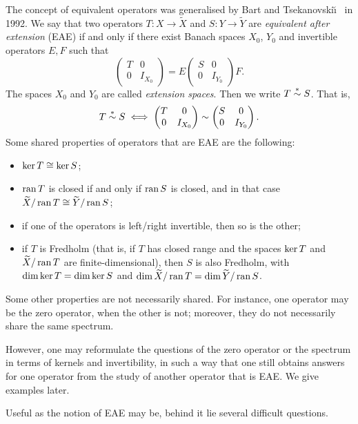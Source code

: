 \documentclass[11pt]{article}
\def\beq{\begin{equation}}
\def\eeq{\end{equation}}
\def\wX{\widetilde X}
\def\wY{\widetilde Y}
\def\ker{\mathop{\rm ker}\nolimits}
\def\ran{\mathop{\rm ran}\nolimits}
\newcommand{\simast}{%
    \ensuremath{%
       \stackrel{\mathsf{\ast}}{\sim}}}
\begin{document}
The concept of equivalent operators was generalised by Bart and Tseka\-novski\u\i~\cite{BTsk} in 1992. We say that two operators $T: X \to \wX$ and $S:Y \to \wY$ are
{\em equivalent after extension\/} (EAE) if and only if there exist Banach spaces $X_0$, $Y_0$
and invertible operators $E,F$ such that
\beq\label{eq:8}
\begin{pmatrix}
T & 0 \\ 0 & I_{X_0}
\end{pmatrix} = 
E
\begin{pmatrix}
S & 0 \\ 0 & I_{Y_0}
\end{pmatrix}
F.
\eeq
The spaces $X_0$ and $Y_0$ are called {\em extension spaces}. Then we write $T \simast S$.
That is,
\[ T \simast S \iff \begin{pmatrix}
T & 0 \\ 0 & I_{X_0}
\end{pmatrix} \sim
\begin{pmatrix}
S & 0 \\ 0 & I_{Y_0}
\end{pmatrix}.
\]
Some shared properties of operators that are EAE are the following:
\begin{itemize}
\item $\ker T \cong \ker S$;
\item $\ran T$ is closed if and only if $\ran S$ is closed, and in that case\\
$\wX/\ran T \cong \wY/\ran S$;
\item if one of the operators is left/right invertible, then so is the other;
\item if $T$ is Fredholm  (that is, if $T$  has closed range and
the spaces   
$\ker T$ and $\wX/\ran T$ are finite-dimensional), then  $S$ is also Fredholm, with $\dim \ker T=\dim \ker S$
and $\dim \wX/\ran T = \dim  \wY/\ran S$.
\end{itemize}
Some other properties are not necessarily shared.
For instance, one operator may be the zero operator, when the other is not; 
moreover, they do not necessarily share the same spectrum.

However, one may reformulate the questions of the zero operator or 
the spectrum in terms of kernels and invertibility, in such a way that one still obtains
answers for one operator from the study of another operator that is EAE. We give examples later.

Useful as the notion of EAE may be, behind it lie several difficult questions.\\
\end{document}
